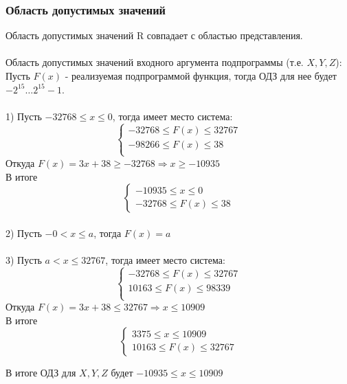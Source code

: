\subsubsection{Область допустимых значений}
\noindent Область допустимых значений R совпадает с областью представления.\\
\\
Область допустимых значений входного аргумента подпрограммы (т.е. $ X,Y,Z $):\\
\hspace*{1cm} Пусть $ F(x) $ - реализуемая подпрограммой функция, тогда ОДЗ для нее будет $-2^{15}\ldots2^{15}-1$.\\
\\
\hspace*{1cm} 1) Пусть $ -32768 \leq x\leq0 $, тогда имеет место система:
\[
	\begin{cases}
	 -32768 \leq F(x) \leq 32767 \\
	-98266\leq F(x)\leq 38\\
	\end{cases}
\]
\hspace*{1cm}Откуда $ F(x) = 3x + 38 \geq -32768 \Rightarrow x \geq -10935$\\
\hspace*{1cm}В итоге \[
	\begin{cases}
	-10935 \leq x \leq 0\\
	-32768 \leq F(x) \leq 38
	\end{cases}
\]
\\
\hspace*{1cm} 2) Пусть $ -0<x\leq a $, тогда $ F(x) = a $\\
\\
\hspace*{1cm} 3) Пусть $ a <x\leq 32767 $, тогда имеет место система:
\[
\begin{cases}
-32768 \leq F(x) \leq 32767 \\
10163\leq F(x)\leq 98339\\
\end{cases}
\]
\hspace*{1cm}Откуда $ F(x) = 3x + 38 \leq 32767 \Rightarrow x \leq 10909$\\
\hspace*{1cm}В итоге \[
\begin{cases}
3375 \leq x \leq 10909\\
10163 \leq F(x) \leq 32767
\end{cases}
\]

В итоге ОДЗ для $ X,Y,Z $ будет $  -10935 \leq x \leq 10909 $



